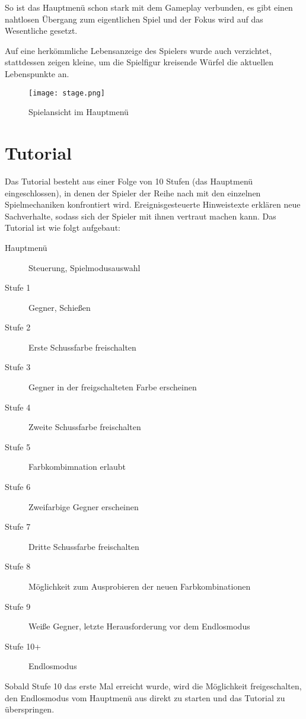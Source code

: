 So ist das Hauptmenü schon stark mit dem Gameplay verbunden, es gibt einen nahtlosen Übergang zum eigentlichen Spiel und der Fokus wird auf das Wesentliche gesetzt.

Auf eine herkömmliche Lebensanzeige des Spielers wurde auch verzichtet, stattdessen zeigen kleine, um die Spielfigur kreisende Würfel die aktuellen Lebenspunkte an.

\begin{figure}[H]
\centering
\texttt{[image: stage.png]}
\caption{Spielansicht im Hauptmenü}
\label{img:stage}
\end{figure}


\section{Tutorial}

Das Tutorial besteht aus einer Folge von 10 Stufen (das Hauptmenü eingeschlossen), in denen der Spieler der Reihe nach mit den einzelnen Spielmechaniken konfrontiert wird. Ereignisgesteuerte Hinweistexte erklären neue Sachverhalte, sodass sich der Spieler mit ihnen vertraut machen kann. Das Tutorial ist wie folgt aufgebaut:

\begin{description}
\item[Hauptmenü] Steuerung, Spielmodusauswahl
\item[Stufe 1] Gegner, Schie{\ss}en
\item[Stufe 2] Erste Schussfarbe freischalten
\item[Stufe 3] Gegner in der freigschalteten Farbe erscheinen
\item[Stufe 4] Zweite Schussfarbe freischalten
\item[Stufe 5] Farbkombimnation erlaubt
\item[Stufe 6] Zweifarbige Gegner erscheinen
\item[Stufe 7] Dritte Schussfarbe freischalten
\item[Stufe 8] Möglichkeit zum Ausprobieren der neuen Farbkombinationen
\item[Stufe 9] Wei{\ss}e Gegner, letzte Herausforderung vor dem Endlosmodus
\item[Stufe 10+] Endlosmodus
\end{description}

Sobald Stufe 10 das erste Mal erreicht wurde, wird die Möglichkeit freigeschalten, den Endlosmodus vom Hauptmenü aus direkt zu starten und das Tutorial zu überspringen.
